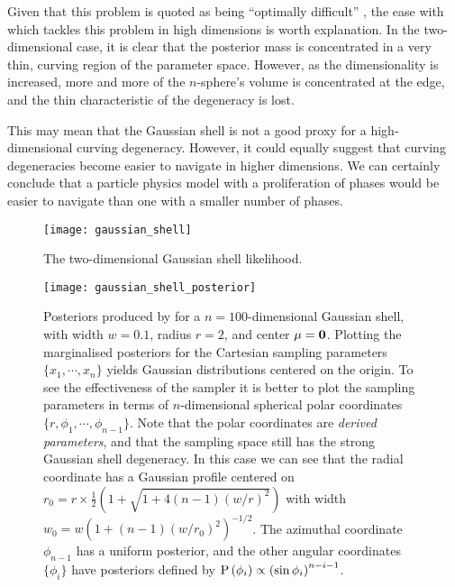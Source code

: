 Given that this problem is quoted as being ``optimally difficult'' \citep{MultiNest2}, the ease with which \PolyChord{} tackles this problem in high dimensions is worth explanation. In the two-dimensional case, it is clear that the posterior mass is concentrated in a very thin, curving region of the parameter space. However, as the dimensionality is increased, more and more of the $n$-sphere's volume is concentrated at the edge, and the thin characteristic of the degeneracy is lost. 

This may mean that the Gaussian shell is not a good proxy for a high-dimensional curving degeneracy. However, it could equally suggest that curving degeneracies become easier to navigate in higher dimensions. We can certainly conclude that a particle physics model with a proliferation of phases would be easier to navigate than one with a smaller number of phases.


\begin{figure}
  \centering
  \texttt{[image: gaussian\_shell]}
  \caption{The two-dimensional Gaussian shell likelihood.\label{fig:pc:gaussian_shell}}
\end{figure}

\begin{figure}                                               
  \centering
  \texttt{[image: gaussian\_shell\_posterior]}
  \caption{Posteriors produced by \PolyChord{} for a $n=100$-dimensional Gaussian shell, with width $w=0.1$, radius $r=2$, and center $\mathbf{\mu}=\mathbf{0}$. 
  Plotting the marginalised posteriors for the Cartesian sampling parameters ${\{x_1,\cdots,x_n\}}$ yields Gaussian distributions centered on the origin. To see the effectiveness of the sampler it is better to plot the sampling parameters in terms of $n$-dimensional spherical polar coordinates ${\{r,\phi_1,\cdots,\phi_{n-1}\}}$. Note that the polar coordinates are {\em derived parameters\/}, and that the sampling space still has the strong Gaussian shell degeneracy.
  In this case we can see that the radial coordinate has a Gaussian profile centered on $r_0 = r\times\frac{1}{2} {\left(1 + \sqrt{1 +  4 (n-1) {\left({w}/{r}\right)}^2}\right) }$ with width $w_0 = w{(1+(n-1){(w/r_0)}^2)}^{-1/2}$. 
  The azimuthal coordinate $\phi_{n-1}$ has a uniform posterior, and the other angular coordinates $\{\phi_i\}$ have posteriors defined by $\mathrm{P}\left(\phi_i \right) \propto {\left(\sin\phi_i\right)^{n-i-1}}$.
\label{fig:pc:gaussian_shell_posterior}
}
\end{figure}


